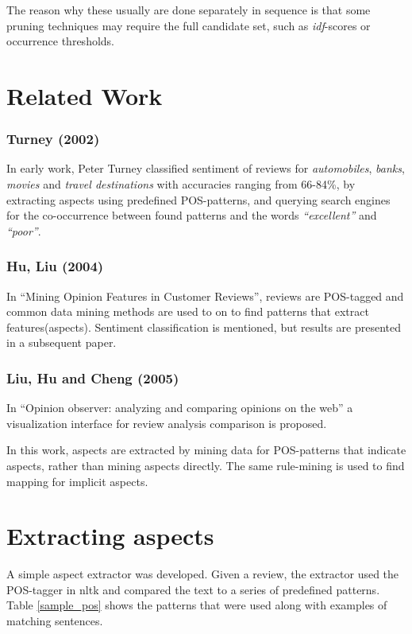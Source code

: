\documentclass[a4paper,11pt]{kth-mag}
\begin{document}
The reason why these usually are done separately in sequence is that some pruning techniques may require the full candidate set, such as \emph{idf}-scores or occurrence thresholds.


\section{Related Work}

\subsubsection{Turney (2002)}
In early work, Peter Turney classified sentiment of reviews for \emph{automobiles}, \emph{banks}, \emph{movies} and \emph{travel destinations} with accuracies ranging from 66-84\%, by extracting aspects using predefined POS-patterns, and querying search engines for the co-occurrence between found patterns and the words \emph{``excellent''} and \emph{``poor''}.

\subsubsection{Hu, Liu (2004)}
In ``Mining Opinion Features in Customer Reviews'', reviews are POS-tagged and common data mining methods are used to on to find patterns that extract features(aspects). Sentiment classification is mentioned, but results are presented in a subsequent paper.

\subsubsection{Liu, Hu and Cheng (2005)}
In ``Opinion observer: analyzing and comparing opinions on the web'' a visualization interface for review analysis comparison is proposed.

In this work, aspects are extracted by mining data for POS-patterns that indicate aspects, rather than mining aspects directly. The same rule-mining is used to find mapping for implicit aspects.

\newpage
\section{Extracting aspects}
A simple aspect extractor was developed. Given a review, the extractor used the POS-tagger in nltk\cite{nltk} and compared the text to a series of predefined patterns. Table \ref{sample_pos} shows the patterns that were used along with examples of matching sentences.
\newcommand{\ExtrPatOne}{\texttt{<NNS?><VB.?>+<JJ.?>+}}
\newcommand{\ExtrPatTwo}{\texttt{<NNS?><VB.?>+<RB.?><JJ.?>}}
\end{document}
